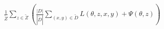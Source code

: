 \documentclass[preview]{standalone}
\begin{document}
\begin{align*}
\frac{1}{\tilde Z} \sum_{z \in \tilde Z} \left( \frac{|D|}{|\tilde D |} \sum_{(x,y) \in \tilde D} L (\theta, z, x, y) + \Psi (\theta, z) \right)
\end{align*}
\end{document}
